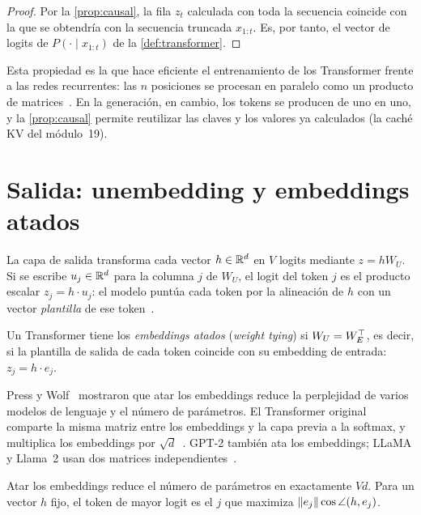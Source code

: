 \begin{proof}
Por la \cref{prop:causal}, la fila $z_t$ calculada con toda la secuencia coincide con la que se obtendría con la secuencia truncada $x_{1:t}$. Es, por tanto, el vector de logits de $P(\cdot\mid x_{1:t})$ de la \cref{def:transformer}.
\end{proof}

Esta propiedad es la que hace eficiente el entrenamiento de los Transformer frente a las redes recurrentes: las $n$ posiciones se procesan en paralelo como un producto de matrices~\cite[§7.3]{jm3}. En la generación, en cambio, los tokens se producen de uno en uno, y la \cref{prop:causal} permite reutilizar las claves y los valores ya calculados (la caché KV del módulo~19).

\section{Salida: unembedding y embeddings atados}

La capa de salida transforma cada vector $h\in\mathbb{R}^{d}$ en $V$ logits mediante $z=hW_U$. Si se escribe $u_j\in\mathbb{R}^{d}$ para la columna $j$ de $W_U$, el logit del token $j$ es el producto escalar $z_j=h\cdot u_j$: el modelo puntúa cada token por la alineación de $h$ con un vector \emph{plantilla} de ese token~\cite[§7.5]{jm3}.

\begin{definicion}\label{def:atados}
Un Transformer tiene los \emph{embeddings atados} (\emph{weight tying}) si $W_U=W_E^{\top}$, es decir, si la plantilla de salida de cada token coincide con su embedding de entrada: $z_j=h\cdot e_j$.
\end{definicion}

Press y Wolf~\cite{presswolf} mostraron que atar los embeddings reduce la perplejidad de varios modelos de lenguaje y el número de parámetros. El Transformer original comparte la misma matriz entre los embeddings y la capa previa a la softmax, y multiplica los embeddings por $\sqrt{d}$~\cite[§3.4]{vaswani}. GPT-2 también ata los embeddings; LLaMA y Llama~2 usan dos matrices independientes~\cite{llamacode}.

\begin{proposicion}\label{prop:ahorro}
Atar los embeddings reduce el número de parámetros en exactamente $Vd$. Para un vector $h$ fijo, el token de mayor logit es el $j$ que maximiza $\lVert e_j\rVert\cos\angle(h,e_j)$.
\end{proposicion}

